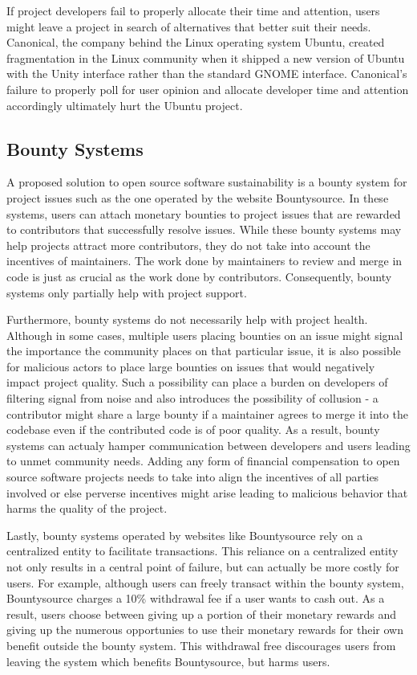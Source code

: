 If project developers fail to properly allocate their time and attention, users
might leave a project in search of alternatives that better suit
their needs. Canonical, the company behind the Linux operating system Ubuntu,
created fragmentation in the Linux community when it shipped a new version of
Ubuntu with the Unity interface rather than the standard GNOME
interface\cite{ubuntuUnity}. Canonical's failure to properly poll for user
opinion and allocate developer time and attention accordingly ultimately hurt
the Ubuntu project.

\subsection{Bounty Systems}

A proposed solution to open source software sustainability is a bounty system
for project issues such as the one operated by the website
Bountysource\cite{bountysource}. In these systems, users can attach monetary
bounties to project issues that are rewarded to contributors that successfully
resolve issues. While these bounty systems may help projects attract more
contributors, they do not take into account the incentives of maintainers. The
work done by maintainers to review and merge in code is just
as crucial as the work done by contributors. Consequently, bounty systems only
partially help with project support.

Furthermore, bounty systems do not necessarily help with
project health. Although in some cases, multiple users placing bounties on an
issue might signal the importance the community places on that particular issue,
it is also possible for malicious actors to place large bounties on issues that
would negatively impact project quality. Such a possibility can place a burden
on developers of filtering signal from noise and also introduces the possibility
of collusion - a contributor might share a large bounty if a maintainer agrees
to merge it into the codebase even if the contributed code is of poor quality.
As a result, bounty systems can actualy hamper communication
between developers and users leading to unmet community needs. Adding any form of financial compensation to open source
software projects needs to take into align the incentives of all parties
involved or else perverse incentives might arise leading to malicious behavior
that harms the quality of the project.

Lastly, bounty systems operated by websites like Bountysource rely on a
centralized entity to facilitate transactions. This reliance on a centralized
entity not only results in a central point of failure, but can actually be more
costly for users. For example, although users can freely transact within the bounty system, Bountysource
charges a 10\% withdrawal fee if a user wants to cash out. As a result, users
choose between giving up a portion of their monetary rewards and giving up the numerous
opportunies to use their monetary rewards for their own benefit outside the bounty system. This withdrawal free
discourages users from leaving the system which benefits Bountysource, but harms users.

